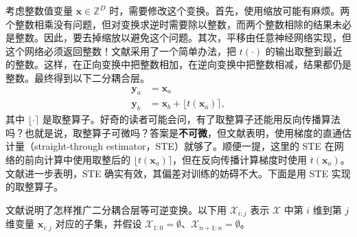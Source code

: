 考虑整数值变量 $\mathbf{x}\in\mathbb{Z}^D$ 时，需要修改这个变换。首先，使用缩放可能有麻烦。两个整数相乘没有问题，但对变换求逆时需要除以整数，而两个整数相除的结果未必是整数。因此，要去掉缩放以避免这个问题。其次，平移由任意神经网络实现，但这个网络必须返回整数！文献采用了一个简单办法，把 $t(\cdot)$ 的输出取整到最近的整数。这样，在正向变换中把整数相加，在逆向变换中把整数相减，结果都仍是整数。最终得到以下二分耦合层。
\begin{align}
\mathbf{y}_a&=\mathbf{x}_a
\tag{4.35}\label{eq:04-35}\\
\mathbf{y}_b&=\mathbf{x}_b+\lfloor t(\mathbf{x}_a)\rceil,
\tag{4.36}\label{eq:04-36}
\end{align}
其中 $\lfloor\cdot\rceil$ 是取整算子。好奇的读者可能会问，有了取整算子还能用反向传播算法吗？也就是说，取整算子可微吗？答案是\textbf{不可微}，但文献表明，使用梯度的直通估计量（straight-through estimator，STE）就够了。顺便一提，这里的 STE 在网络的前向计算中使用取整后的 $\lfloor t(\mathbf{x}_a)\rceil$，但在反向传播计算梯度时使用 $t(\mathbf{x}_a)$。文献进一步表明，STE 确实有效，其偏差对训练的妨碍不大。下面是用 STE 实现的取整算子。


文献说明了怎样推广二分耦合层等可逆变换。以下用 $\mathcal{X}_{i:j}$ 表示 $\mathcal{X}$ 中第 $i$ 维到第 $j$ 维变量 $\mathbf{x}_{i:j}$ 对应的子集，并假设 $\mathcal{X}_{1:0}=\emptyset$、$\mathcal{X}_{n+1:n}=\emptyset$。

